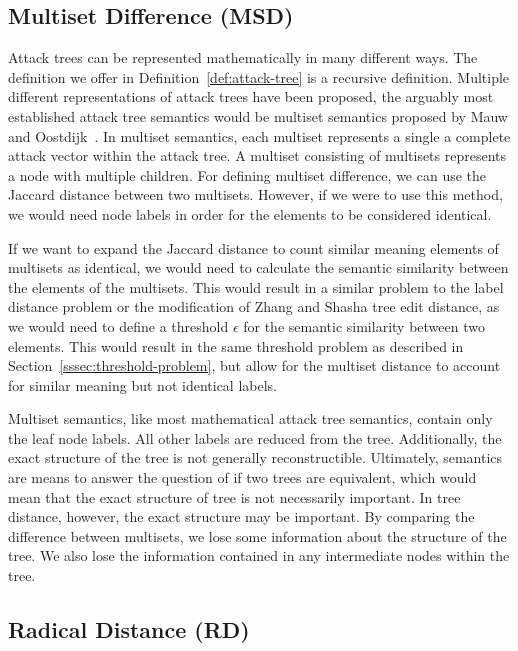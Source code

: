 \subsection{Multiset Difference (MSD)}
\label{ssec:msd}

Attack trees can be represented mathematically in many different ways. The definition we offer in Definition~\ref{def:attack-tree} is a recursive definition. Multiple different representations of attack trees have been proposed, the arguably most established attack tree semantics would be multiset semantics proposed by Mauw and Oostdijk~\cite{mauw_foundations_2006}. In multiset semantics, each multiset represents a single a complete attack vector within the attack tree. A multiset consisting of multisets represents a node with multiple children. For defining multiset difference, we can use the Jaccard distance between two multisets. However, if we were to use this method, we would need node labels in order for the elements to be considered identical.

If we want to expand the Jaccard distance to count similar meaning elements of multisets as identical, we would need to calculate the semantic similarity between the elements of the multisets. This would result in a similar problem to the label distance problem or the modification of Zhang and Shasha tree edit distance, as we would need to define a threshold $\epsilon$ for the semantic similarity between two elements. This would result in the same threshold problem as described in Section~\ref{sssec:threshold-problem}, but allow for the multiset distance to account for similar meaning but not identical labels.

Multiset semantics, like most mathematical attack tree semantics, contain only the leaf node labels. All other labels are reduced from the tree. Additionally, the exact structure of the tree is not generally reconstructible. Ultimately, semantics are means to answer the question of if two trees are equivalent, which would mean that the exact structure of tree is not necessarily important. In tree distance, however, the exact structure may be important. By comparing the difference between multisets, we lose some information about the structure of the tree. We also lose the information contained in any intermediate nodes within the tree.



\subsection{Radical Distance (RD)}
\label{ssec:rd}

